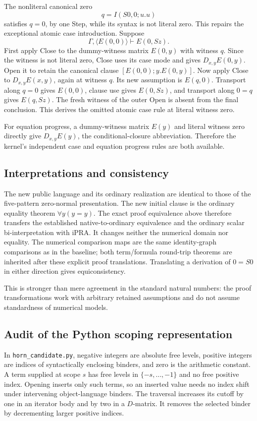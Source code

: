 The nonliteral canonical zero
\[
 q=I(S0,0;u.u)
\]
satisfies \(q=0\), by one Step, while its syntax is not literal zero.
This repairs the exceptional atomic case introduction. Suppose
\[
 \Gamma,\langle E(0,0)\rangle\vdash E(0,Sz).
\]
First apply Close to the dummy-witness matrix \(E(0,y)\) with witness
\(q\). Since the witness is not literal zero, Close uses its case mode
and gives \(D_{x,y}E(0,y)\). Open it to retain the canonical clause
\([E(0,0);y.E(0,y)]\).
Now apply Close to \(D_{x,y}E(x,y)\), again at witness \(q\).
Its new assumption is \(E(q,0)\). Transport along \(q=0\) gives
\(E(0,0)\), clause use gives \(E(0,Sz)\), and transport along \(0=q\)
gives \(E(q,Sz)\). The fresh witness of the outer Open is absent from
the final conclusion. This derives the omitted atomic case rule at
literal witness zero.

For equation progress, a dummy-witness matrix \(E(y)\) and literal
witness zero directly give \(D_{x,y}E(y)\), the conditional-closure
abbreviation. Therefore the kernel's independent case and equation
progress rules are both available.

\subsection{Interpretations and consistency}
The new public language and its ordinary realization are identical to
those of the five-pattern zero-normal presentation. The new initial
clause is the ordinary equality theorem \(\forall y(y=y)\).
The exact proof equivalence above therefore transfers the established
native-to-ordinary equivalence and the ordinary scalar bi-interpretation
with iPRA. It changes neither the numerical domain nor equality.
The numerical comparison maps are the same identity-graph comparisons
as in the baseline; both term/formula round-trip theorems are inherited
after these explicit proof translations. Translating a derivation of
\(0=S0\) in either direction gives equiconsistency.

This is stronger than mere agreement in the standard natural numbers:
the proof transformations work with arbitrary retained assumptions and
do not assume standardness of numerical models.

\subsection{Audit of the Python scoping representation}
In \texttt{horn\_candidate.py}, negative integers are absolute free
levels, positive integers are indices of syntactically enclosing binders,
and zero is the arithmetic constant. A term supplied at scope \(s\)
has free levels in \(\{-s,\ldots,-1\}\) and no free positive index.
Opening inserts only such terms, so an inserted value needs no index
shift under intervening object-language binders. The traversal increases
its cutoff by one in an iterator body and by two in a \(D\)-matrix.
It removes the selected binder by decrementing larger positive indices.

